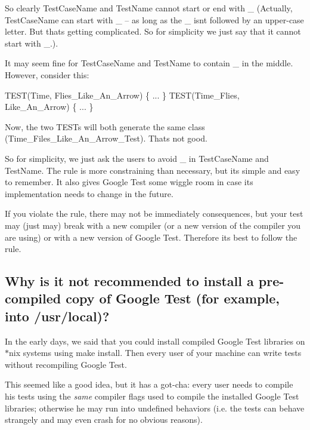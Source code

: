 So clearly {\ttfamily Test\+Case\+Name} and {\ttfamily Test\+Name} cannot start or end with {\ttfamily \+\_\+} (Actually, {\ttfamily Test\+Case\+Name} can start with {\ttfamily \+\_\+} -- as long as the {\ttfamily \+\_\+} isn\textquotesingle{}t followed by an upper-\/case letter. But that\textquotesingle{}s getting complicated. So for simplicity we just say that it cannot start with {\ttfamily \+\_\+}.).

It may seem fine for {\ttfamily Test\+Case\+Name} and {\ttfamily Test\+Name} to contain {\ttfamily \+\_\+} in the middle. However, consider this\+: 
\begin{DoxyCode}
TEST(Time, Flies\_Like\_An\_Arrow) \{ ... \}
TEST(Time\_Flies, Like\_An\_Arrow) \{ ... \}
\end{DoxyCode}


Now, the two {\ttfamily T\+E\+ST}s will both generate the same class ({\ttfamily Time\+\_\+\+Files\+\_\+\+Like\+\_\+\+An\+\_\+\+Arrow\+\_\+\+Test}). That\textquotesingle{}s not good.

So for simplicity, we just ask the users to avoid {\ttfamily \+\_\+} in {\ttfamily Test\+Case\+Name} and {\ttfamily Test\+Name}. The rule is more constraining than necessary, but it\textquotesingle{}s simple and easy to remember. It also gives Google Test some wiggle room in case its implementation needs to change in the future.

If you violate the rule, there may not be immediately consequences, but your test may (just may) break with a new compiler (or a new version of the compiler you are using) or with a new version of Google Test. Therefore it\textquotesingle{}s best to follow the rule.

\subsection*{Why is it not recommended to install a pre-\/compiled copy of Google Test (for example, into /usr/local)?}

In the early days, we said that you could install compiled Google Test libraries on {\ttfamily $\ast$}nix systems using {\ttfamily make install}. Then every user of your machine can write tests without recompiling Google Test.

This seemed like a good idea, but it has a got-\/cha\+: every user needs to compile his tests using the {\itshape same} compiler flags used to compile the installed Google Test libraries; otherwise he may run into undefined behaviors (i.\+e. the tests can behave strangely and may even crash for no obvious reasons).

